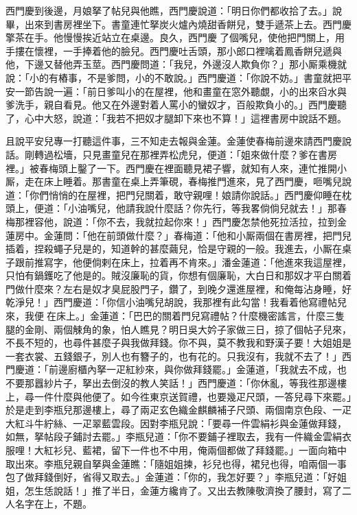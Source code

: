 西門慶到後邊，月娘拏了帖兒與他瞧，西門慶說道：「明日你們都收拾了去。」說畢，出來到書房裡坐下。書童連忙拏炭火爐內燒甜香餅兒，雙手遞茶上去。{}西門慶擎茶在手。他慢慢挨近站立在桌邊。{}良久，西門慶𢫓了個嘴兒，使他把門關上，用手摟在懷裡，一手捧着他的臉兒。西門慶吐舌頭，那小郎口裡噙着鳳香餅兒遞與他，下邊又替他弄玉莖。西門慶問道：「我兒，外邊沒人欺負你？」那小厮乘機就說：「小的有樁事，不是爹問，小的不敢說。」西門慶道：「你說不妨。」書童就把平安一節告說一遍：「前日爹叫小的在屋裡，他和畫童在窓外聽覷，小的出來舀水與爹洗手，親自看見。他又在外邊對着人罵小的蠻奴才，百般欺負小的。」西門慶聽了，心中大怒，說道：「我若不把奴才腿卸下來也不算！」這裡書房中說話不題。

且說平安兒專一打聽這件事，三不知走去報與金蓮。金蓮使春梅前邊來請西門慶說話。剛轉過松墻，只見畫童兒在那裡弄松虎兒，{}便道：「姐來做什麼？爹在書房裡。」被春梅頭上鑿了一下。西門慶在裡面聽見裙子響，就知有人來，連忙推開小厮，走在床上睡着。那書童在桌上弄筆硯，春梅推門進來，見了西門慶，咂嘴兒說道：「你們悄悄的在屋裡，把門兒關着，敢守親哩！娘請你說話。」西門慶仰睡在枕頭上，便道：「小油嘴兒，他請我說什麼話？你先行，等我畧倘倘兒就去！」那春梅那裡容他，說道：「你不去，我就拉起你來！」西門慶怎禁他死拉活拉，拉到金蓮房中。金蓮問：「他在前頭做什麼？」春梅道：「他和小厮兩個在書房裡，把門兒插着，捏殺蠅子兒是的，知道幹的甚麼繭兒，恰是守親的一般。我進去，小厮在桌子跟前推寫字，他便倘剌在床上，拉着再不肯來。」潘金蓮道：「他進來我這屋裡，只怕有鍋鑊吃了他是的。{}賊沒廉恥的貨，你想有個廉恥，大白日和那奴才平白關着門做什麼來？左右是奴才臭屁股門子，鑽了，到晚夕還進屋裡，和俺每沾身睡，好乾淨兒！」{}西門慶道：「你信小油嘴兒胡說，我那裡有此勾當！我看着他寫禮帖兒來，我便𢱉在床上。」金蓮道：「巴巴的關着門兒寫禮帖？什麼機密謠言，什麼三隻腿的金剛、兩個觫角的象，{}怕人瞧見？明日吳大妗子家做三日，掠了個帖子兒來，不長不短的，也尋件甚麼子與我做拜錢。你不與，莫不教我和野漢子要！大姐姐是一套衣裳、五錢銀子，別人也有簪子的，也有花的。只我沒有，我就不去了！」西門慶道：「前邊廚櫃內拏一疋紅紗來，與你做拜錢罷。」金蓮道，「我就去不成，也不要那囂紗片子，拏出去倒沒的教人笑話！」西門慶道：「你休亂，等我徃那邊樓上，尋一件什麼與他便了。如今徃東京送賀禮，也要幾疋尺頭，一答兒尋下來罷。」於是走到李瓶兒那邊樓上，尋了兩疋玄色織金麒麟補子尺頭、兩個南京色段、一疋大紅斗牛紵絲、一疋翠藍雲段。因對李瓶兒說：「要尋一件雲絹衫與金蓮做拜錢，如無，拏帖段子鋪討去罷。」李瓶兒道：「你不要鋪子裡取去，我有一件織金雲絹衣服哩！大紅衫兒、藍裙，留下一件也不中用，俺兩個都做了拜錢罷。」一面向箱中取出來。李瓶兒親自拏與金蓮瞧：「隨姐姐揀，衫兒也得，裙兒也得，咱兩個一事包了做拜錢倒好，省得又取去。」金蓮道：「你的，我怎好要？」李瓶兒道：「好姐姐，怎生恁說話！」推了半日，金蓮方纔肯了。又出去教陳敬濟換了腰封，寫了二人名字在上，不題。

